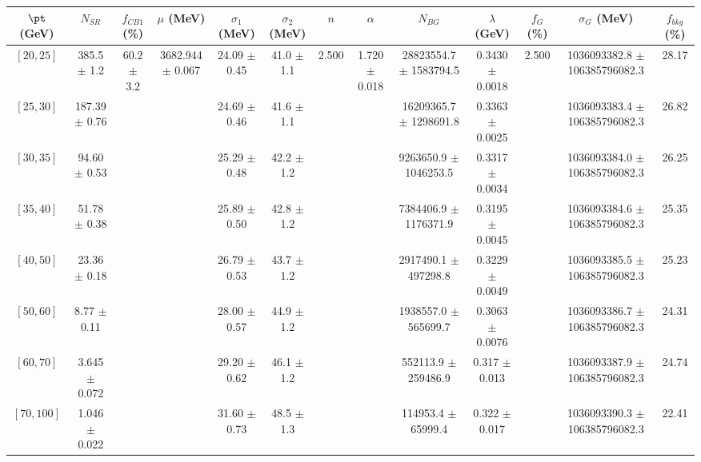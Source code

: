 \begin{tabular}{c||c|c|c|c|c|c|c|c|c|c|c||c}
$\pt$ (GeV) & $N_{SR}$ & $f_{CB1}$ (\%) & $\mu$ (MeV) & $\sigma_1$ (MeV) & $\sigma_2$ (MeV) & $n$ & $\alpha$ & $N_{BG}$ & $\lambda$ (GeV) & $f_G$ (\%) & $\sigma_G$ (MeV) & $f_{bkg}$ (\%) \\
\hline
$[20, 25]$ & 385.5 $\pm$ 1.2 & \multirow{8}{*}{60.2 $\pm$ 3.2} & \multirow{8}{*}{3682.944 $\pm$ 0.067} & 24.09 $\pm$ 0.45 & 41.0 $\pm$ 1.1 & \multirow{8}{*}{2.500} & \multirow{8}{*}{1.720 $\pm$ 0.018} & 28823554.7 $\pm$ 1583794.5 & 0.3430 $\pm$ 0.0018 & \multirow{8}{*}{2.500} & 1036093382.8 $\pm$ 106385796082.3 & 28.17\\
$[25, 30]$ & 187.39 $\pm$ 0.76 &  &  & 24.69 $\pm$ 0.46 & 41.6 $\pm$ 1.1 &  &  & 16209365.7 $\pm$ 1298691.8 & 0.3363 $\pm$ 0.0025 &  & 1036093383.4 $\pm$ 106385796082.3 & 26.82\\
$[30, 35]$ & 94.60 $\pm$ 0.53 &  &  & 25.29 $\pm$ 0.48 & 42.2 $\pm$ 1.2 &  &  & 9263650.9 $\pm$ 1046253.5 & 0.3317 $\pm$ 0.0034 &  & 1036093384.0 $\pm$ 106385796082.3 & 26.25\\
$[35, 40]$ & 51.78 $\pm$ 0.38 &  &  & 25.89 $\pm$ 0.50 & 42.8 $\pm$ 1.2 &  &  & 7384406.9 $\pm$ 1176371.9 & 0.3195 $\pm$ 0.0045 &  & 1036093384.6 $\pm$ 106385796082.3 & 25.35\\
$[40, 50]$ & 23.36 $\pm$ 0.18 &  &  & 26.79 $\pm$ 0.53 & 43.7 $\pm$ 1.2 &  &  & 2917490.1 $\pm$ 497298.8 & 0.3229 $\pm$ 0.0049 &  & 1036093385.5 $\pm$ 106385796082.3 & 25.23\\
$[50, 60]$ & 8.77 $\pm$ 0.11 &  &  & 28.00 $\pm$ 0.57 & 44.9 $\pm$ 1.2 &  &  & 1938557.0 $\pm$ 565699.7 & 0.3063 $\pm$ 0.0076 &  & 1036093386.7 $\pm$ 106385796082.3 & 24.31\\
$[60, 70]$ & 3.645 $\pm$ 0.072 &  &  & 29.20 $\pm$ 0.62 & 46.1 $\pm$ 1.2 &  &  & 552113.9 $\pm$ 259486.9 & 0.317 $\pm$ 0.013 &  & 1036093387.9 $\pm$ 106385796082.3 & 24.74\\
$[70, 100]$ & 1.046 $\pm$ 0.022 &  &  & 31.60 $\pm$ 0.73 & 48.5 $\pm$ 1.3 &  &  & 114953.4 $\pm$ 65999.4 & 0.322 $\pm$ 0.017 &  & 1036093390.3 $\pm$ 106385796082.3 & 22.41\\
\end{tabular}
